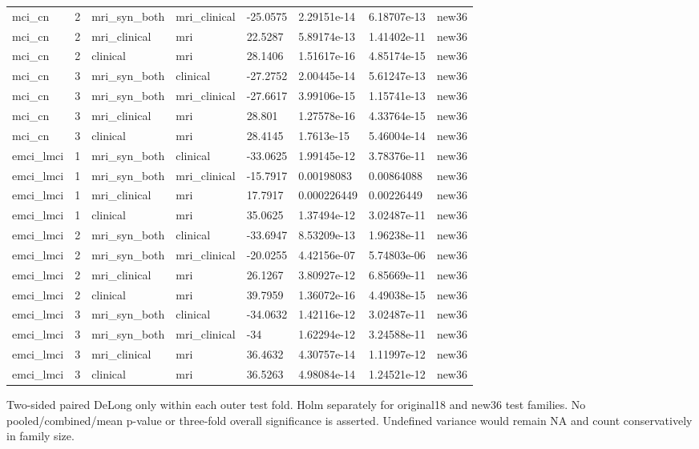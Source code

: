 \documentclass{article}
\providecommand{\DIFaddtex}[1]{{\protect\color{blue} \sf #1}} %
\providecommand{\DIFadd}[1]{\texorpdfstring{\DIFaddtex{#1}}{#1}} %
\begin{document}
\begin{landscape}
\begin{longtable}{llllllll}
mci\_cn & 2 & mri\_syn\_both & mri\_clinical & -25.0575 & 2.29151e-14 & 6.18707e-13 & new36 \\
mci\_cn & 2 & mri\_clinical & mri & 22.5287 & 5.89174e-13 & 1.41402e-11 & new36 \\
mci\_cn & 2 & clinical & mri & 28.1406 & 1.51617e-16 & 4.85174e-15 & new36 \\
mci\_cn & 3 & mri\_syn\_both & clinical & -27.2752 & 2.00445e-14 & 5.61247e-13 & new36 \\
mci\_cn & 3 & mri\_syn\_both & mri\_clinical & -27.6617 & 3.99106e-15 & 1.15741e-13 & new36 \\
mci\_cn & 3 & mri\_clinical & mri & 28.801 & 1.27578e-16 & 4.33764e-15 & new36 \\
mci\_cn & 3 & clinical & mri & 28.4145 & 1.7613e-15 & 5.46004e-14 & new36 \\
emci\_lmci & 1 & mri\_syn\_both & clinical & -33.0625 & 1.99145e-12 & 3.78376e-11 & new36 \\
emci\_lmci & 1 & mri\_syn\_both & mri\_clinical & -15.7917 & 0.00198083 & 0.00864088 & new36 \\
emci\_lmci & 1 & mri\_clinical & mri & 17.7917 & 0.000226449 & 0.00226449 & new36 \\
emci\_lmci & 1 & clinical & mri & 35.0625 & 1.37494e-12 & 3.02487e-11 & new36 \\
emci\_lmci & 2 & mri\_syn\_both & clinical & -33.6947 & 8.53209e-13 & 1.96238e-11 & new36 \\
emci\_lmci & 2 & mri\_syn\_both & mri\_clinical & -20.0255 & 4.42156e-07 & 5.74803e-06 & new36 \\
emci\_lmci & 2 & mri\_clinical & mri & 26.1267 & 3.80927e-12 & 6.85669e-11 & new36 \\
emci\_lmci & 2 & clinical & mri & 39.7959 & 1.36072e-16 & 4.49038e-15 & new36 \\
emci\_lmci & 3 & mri\_syn\_both & clinical & -34.0632 & 1.42116e-12 & 3.02487e-11 & new36 \\
emci\_lmci & 3 & mri\_syn\_both & mri\_clinical & -34 & 1.62294e-12 & 3.24588e-11 & new36 \\
emci\_lmci & 3 & mri\_clinical & mri & 36.4632 & 4.30757e-14 & 1.11997e-12 & new36 \\
emci\_lmci & 3 & clinical & mri & 36.5263 & 4.98084e-14 & 1.24521e-12 & new36 \\
\end{longtable}
\noindent\parbox{\linewidth}{\footnotesize \DIFadd{Two-sided paired DeLong only within each outer test fold. Holm separately for original18 and new36 test families. No pooled/combined/mean p-value or three-fold overall significance is asserted. Undefined variance would remain NA and count conservatively in family size.}}
\endgroup
\end{landscape}
\end{document}
